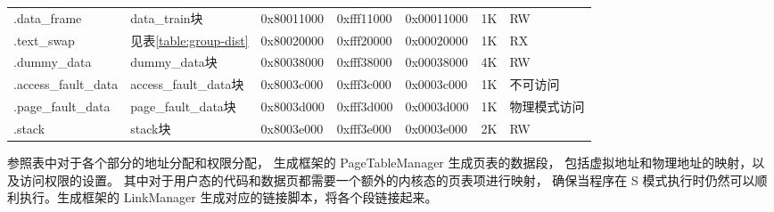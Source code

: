 \begin{table}[h!]
\begin{center}
{\begin{tabular}{|l|l|l|l|l|l|l|}
            .data\_frame &   data\_train块&   0x80011000  &   0xfff11000      &   0x00011000      &   1K  &   RW              \\
            .text\_swap  &   见表\ref{table:group-dist}  &   0x80020000  &   0xfff20000      &   0x00020000      &   1K  &   RX              \\
            .dummy\_data &   dummy\_data块&   0x80038000  &   0xfff38000      &   0x00038000      &   4K  &   RW              \\
            .access\_fault\_data  &   access\_fault\_data块 &   0x8003c000  &   0xfff3c000  &   0x0003c000  &   1K  &   不可访问 \\
            .page\_fault\_data    &   page\_fault\_data块   &   0x8003d000  &   0xfff3d000  &   0x0003d000  &   1K  &   物理模式访问 \\
            .stack      &   stack块     &   0x8003e000  &   0xfff3e000  &   0x0003e000  &   2K  &  RW \\
            \hline
        \end{tabular}
    }
    \end{center}
\end{table}

\begin{table}[h!]
    \begin{center} 
    \caption{group地址排布} 
    \label{table:group-dist}  
    \end{center}
\end{table}

参照表中对于各个部分的地址分配和权限分配， 生成框架的 PageTableManager 生成页表的数据段，
包括虚拟地址和物理地址的映射，以及访问权限的设置。
其中对于用户态的代码和数据页都需要一个额外的内核态的页表项进行映射，
确保当程序在 S 模式执行时仍然可以顺利执行。生成框架的 LinkManager 生成对应的链接脚本，将各个段链接起来。\par

